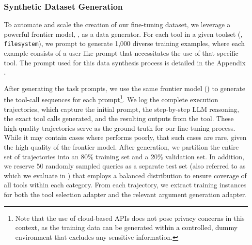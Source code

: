 \subsubsection{Synthetic Dataset Generation}
To automate and scale the creation of our fine-tuning dataset, we leverage a powerful frontier model, \gptfivemini{}, as a data generator. For each tool in a given toolset (\eg, \texttt{filesystem}), we prompt \gptfivemini{} to generate 1,000 diverse training examples, where each example consists of a user-like prompt that necessitates the use of that specific tool. The prompt used for this data synthesis process is detailed in the Appendix .

After generating the task prompts, we use the same frontier model (\gptfivemini{}) to generate the tool-call sequences for each prompt\footnote{Note that the use of cloud-based APIs does not pose privacy concerns in this context, as the training data can be generated within a controlled, dummy environment that excludes any sensitive information.}. We log the complete execution trajectories, which capture the initial prompt, the step-by-step LLM reasoning, the exact tool calls generated, and the resulting outputs from the tool. These high-quality trajectories serve as the ground truth for our fine-tuning process. While it may contain cases where \gptfivemini{} performs poorly, that such cases are rare, given the high quality of the frontier model. 
After generation, we partition the entire set of trajectories into an 80\% training set and a 20\% validation set. In addition, we reserve 50 randomly sampled queries as a separate test set (also referred to as \renabench{} which we evaluate in ) that employs a balanced distribution to ensure coverage of all tools within each category. From each trajectory, we extract training instances for both the tool selection adapter and the relevant argument generation adapter. 


